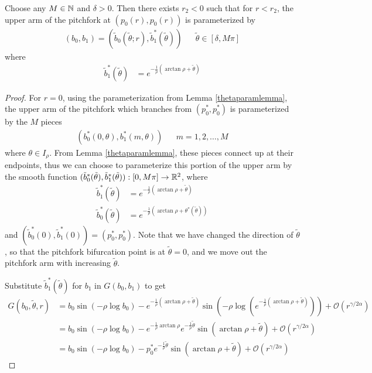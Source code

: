 \documentclass[thesis.tex]{subfiles}
\begin{document}
\begin{lemma}\label{upperarmpersists}
Choose any $M \in {\mathbb N}$ and $\delta > 0$. Then there exists $r_2 < 0$ such that for $r < r_2$, the upper arm of the pitchfork at $(p_0(r), p_0(r))$ is parameterized by
\begin{align*}
(b_0, b_1) = (\tilde{b}_0(\tilde{\theta}; r), \tilde{b}^*_1(\tilde{\theta})) && \tilde{\theta} \in [\delta, M \pi]
\end{align*}
where
\begin{align*}
\tilde{b}_1^*(\tilde{\theta}) &= e^{-\frac{1}{\rho}(\arctan \rho +\tilde{\theta})} 
\end{align*}

\begin{proof}
For $r = 0$, using the parameterization from Lemma \ref{thetaparamlemma}, the upper arm of the pitchfork which branches from $(p_0^*, p_0^*)$ is parameterized by the $M$ pieces
\begin{align}\label{Mpieceparam}
(b_0^*(0, \theta), b_1^*(m, \theta)) && m = 1, 2, \dots, M
\end{align}
where $\theta \in I_\rho$. From Lemma \ref{thetaparamlemma}, these pieces connect up at their endpoints, thus we can choose to parameterize this portion of the upper arm by the smooth function $(\tilde{b}^*_0(\tilde{\theta}), \tilde{b}^*_1(\tilde{\theta})): [0, M \pi] \rightarrow {\mathbb R}^2$, where 
\begin{align*}
\tilde{b}_1^*(\tilde{\theta}) &= e^{-\frac{1}{\rho}(\arctan \rho +\tilde{\theta})} \\
\tilde{b}_0^*(\tilde{\theta}) &= e^{-\frac{1}{\rho}(\arctan \rho + \theta^*(\tilde{\theta}))}
\end{align*}
and $(\tilde{b}^*_0(0), \tilde{b}^*_1(0)) = (p_0^*, p_0^*)$. Note that we have changed the direction of $\tilde{\theta}$, so that the pitchfork bifurcation point is at $\tilde{\theta} = 0$, and we move out the pitchfork arm with increasing $\tilde{\theta}$.

Substitute $\tilde{b}_1^*(\tilde{\theta})$ for $b_1$ in $G(b_0, b_1)$ to get
\begin{align*}
G(b_0, \tilde{\theta}, r) 
&= b_0 \sin(-\rho \log b_0) - e^{-\frac{1}{\rho}(\arctan \rho + \tilde{\theta})} \sin\left(-\rho \log \left( e^{-\frac{1}{\rho}(\arctan \rho + \tilde{\theta})}\right)\right) + \mathcal{O}(r^{\gamma/2\alpha}) \\
&= b_0 \sin(-\rho \log b_0) - e^{-\frac{1}{\rho}\arctan \rho}e^{-\frac{1}{\rho}\tilde{\theta}} \sin\left(\arctan \rho + \tilde{\theta} \right) + \mathcal{O}(r^{\gamma/2\alpha}) \\
&= b_0 \sin(-\rho \log b_0) - p_0^* e^{-\frac{1}{\rho}\tilde{\theta}} \sin\left(\arctan \rho + \tilde{\theta} \right) + \mathcal{O}(r^{\gamma/2\alpha}) 
\end{align*}


\end{proof}
\end{lemma}
\end{document}
